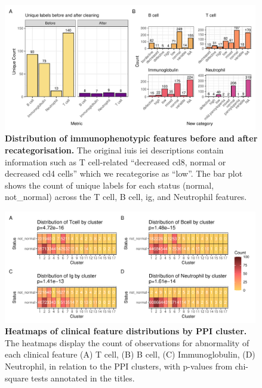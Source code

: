 \begin{figure}[ht]
  \centering
  \includegraphics[width=0.99\textwidth]{../images/plot_patch1.pdf}
  \caption{ \textbf{Distribution of immunophenotypic features before and after recategorisation.}
  The original \ac{iuis} \ac{iei} descriptions contain information such as T cell-related
  ``decreased cd8, normal or decreased cd4 cells'' which we recategorise as ``low''.
  The bar plot shows the count of unique labels for each status (normal, not\_normal) across the T cell, B cell, \ac{ig}, and Neutrophil features.}
  \label{fig:immunophenotype_before_after}
\end{figure}

\begin{figure}[ht]
  \centering
  \includegraphics[width=0.99\textwidth]{../images/plot_multicat_patch_3_clust_chi.pdf}
  \caption{\textbf{Heatmaps of clinical feature distributions by PPI cluster.} The heatmaps display the count of observations for abnormality of each clinical feature (A) T cell, (B) B cell, (C) Immunoglobulin, (D) Neutrophil, in relation to the PPI clusters, with p-values from chi-square tests annotated in the titles.}
  \label{fig:plot_multicat_patch_3_clust_chi}
\end{figure}

